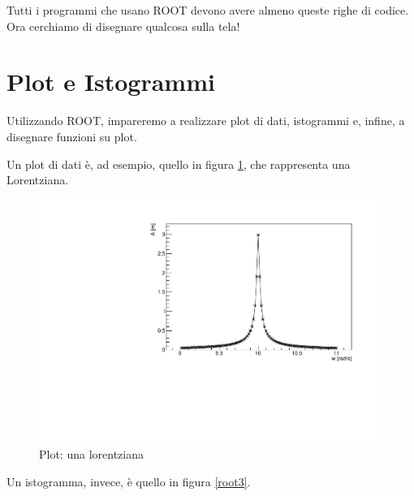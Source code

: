 Tutti i programmi che usano ROOT devono avere almeno queste righe di codice. Ora cerchiamo di disegnare qualcosa sulla tela!
\section{Plot e Istogrammi}
Utilizzando ROOT, impareremo a realizzare plot di dati, istogrammi e, infine, a disegnare funzioni su plot.

Un plot di dati è, ad esempio, quello in figura \ref{root2}, che rappresenta una Lorentziana.
\begin{figure} [h]
	\centering
	\includegraphics[scale=\scaledim]{Immagini/scatter.pdf}  
	\caption{Plot: una lorentziana}
	\label{root2}
\end{figure}
Un istogramma, invece, è quello in figura \ref{root3}.



